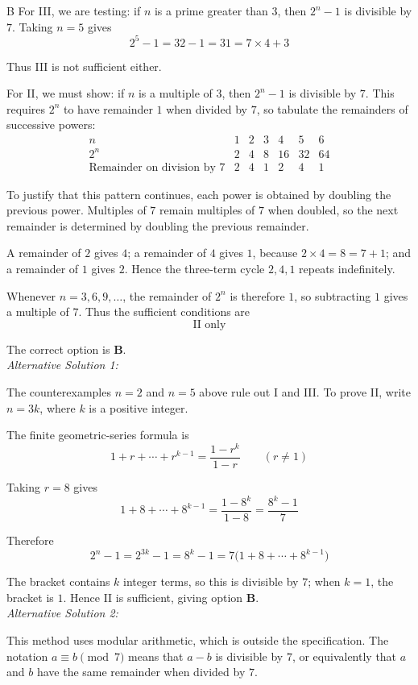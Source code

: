\documentclass[11pt,a4paper]{article}
\begin{document}
\begin{enumerate}[label=\textbf{\arabic*.},leftmargin=*,itemsep=0pt,start=16]
\begin{djsSolution}{B}
For III, we are testing: if $n$ is a prime greater than $3$, then $2^n-1$ is divisible by $7$. Taking $n=5$ gives
\[
2^5-1=32-1=31=7\times4+3
\]

Thus III is not sufficient either.

For II, we must show: if $n$ is a multiple of $3$, then $2^n-1$ is divisible by $7$. This requires $2^n$ to have remainder $1$ when divided by $7$, so tabulate the remainders of successive powers:
\[
\begin{array}{c|rrrrrr}
n&1&2&3&4&5&6\\[5pt]
2^n&2&4&8&16&32&64\\[5pt]
\text{Remainder on division by }7&2&4&1&2&4&1
\end{array}
\]

To justify that this pattern continues, each power is obtained by doubling the previous power. Multiples of $7$ remain multiples of $7$ when doubled, so the next remainder is determined by doubling the previous remainder.

A remainder of $2$ gives $4$; a remainder of $4$ gives $1$, because $2\times4=8=7+1$; and a remainder of $1$ gives $2$. Hence the three-term cycle $2,4,1$ repeats indefinitely.

Whenever $n=3,6,9,\ldots$, the remainder of $2^n$ is therefore $1$, so subtracting $1$ gives a multiple of $7$. Thus the sufficient conditions are
\[
\boxed{\text{II only}}
\]

The correct option is \textbf{B}.\\[5pt]

\textit{Alternative Solution 1:}

The counterexamples $n=2$ and $n=5$ above rule out I and III. To prove II, write $n=3k$, where $k$ is a positive integer.

The finite geometric-series formula is
\[
1+r+\cdots+r^{k-1}=\frac{1-r^k}{1-r}\qquad(r\ne1)
\]

Taking $r=8$ gives
\[
1+8+\cdots+8^{k-1}=\frac{1-8^k}{1-8}=\frac{8^k-1}{7}
\]

Therefore
\[
2^n-1=2^{3k}-1=8^k-1=7\bigl(1+8+\cdots+8^{k-1}\bigr)
\]

The bracket contains $k$ integer terms, so this is divisible by $7$; when $k=1$, the bracket is $1$. Hence II is sufficient, giving option \textbf{B}.\\[5pt]

\textit{Alternative Solution 2:}

This method uses modular arithmetic, which is outside the specification. The notation $a\equiv b\pmod{7}$ means that $a-b$ is divisible by $7$, or equivalently that $a$ and $b$ have the same remainder when divided by $7$.


\end{djsSolution}
\end{enumerate}
\end{document}

